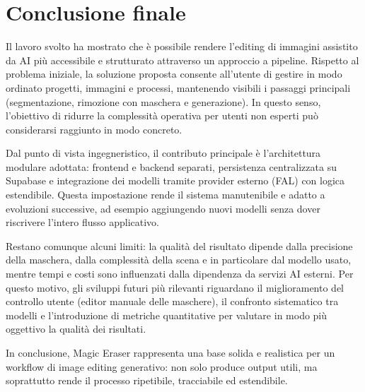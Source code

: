 \documentclass[oneside]{supsistudent}
\begin{document}
\section{Conclusione finale}

Il lavoro svolto ha mostrato che è possibile rendere l’editing di immagini assistito da AI più accessibile e strutturato attraverso un approccio a pipeline. 
Rispetto al problema iniziale, la soluzione proposta consente all’utente di gestire in modo ordinato progetti, immagini e processi, mantenendo visibili i passaggi principali (segmentazione, rimozione con maschera e generazione). 
In questo senso, l’obiettivo di ridurre la complessità operativa per utenti non esperti può considerarsi raggiunto in modo concreto.

Dal punto di vista ingegneristico, il contributo principale è l’architettura modulare adottata: frontend e backend separati, persistenza centralizzata su Supabase e integrazione dei modelli tramite provider esterno (FAL) con logica estendibile. 
Questa impostazione rende il sistema manutenibile e adatto a evoluzioni successive, ad esempio aggiungendo nuovi modelli senza dover riscrivere l’intero flusso applicativo.

Restano comunque alcuni limiti: la qualità del risultato dipende dalla precisione della maschera, dalla complessità della scena e in particolare dal modello usato, mentre tempi e costi sono influenzati dalla dipendenza da servizi AI esterni. 
Per questo motivo, gli sviluppi futuri più rilevanti riguardano il miglioramento del controllo utente (editor manuale delle maschere), il confronto sistematico tra modelli e l’introduzione di metriche quantitative per valutare in modo più oggettivo la qualità dei risultati.

In conclusione, Magic Eraser rappresenta una base solida e realistica per un workflow di image editing generativo: non solo produce output utili, ma soprattutto rende il processo ripetibile, tracciabile ed estendibile.

\end{document}
